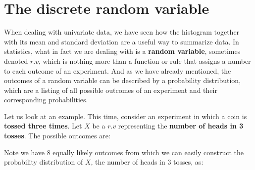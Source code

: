 \documentclass[
  letterpaper,
  DIV=11,
  numbers=noendperiod]{scrreprt}
\begin{document}
\section{The discrete random
variable}\label{the-discrete-random-variable}

When dealing with univariate data, we have seen how the histogram
together with its mean and standard deviation are a useful way to
summarize data. In statistics, what in fact we are dealing with is a
\textbf{random variable}, sometimes denoted \(r.v\), which is nothing
more than a function or rule that assigns a number to each outcome of an
experiment. And as we have already mentioned, the outcomes of a random
variable can be described by a probability distribution, which are a
listing of all possible outcomes of an experiment and their
corresponding probabilities.

Let us look at an example. This time, consider an experiment in which a
coin is \textbf{tossed three times}. Let \(X\) be a \(r.v\) representing
the \textbf{number of heads in 3 tosses}. The possible outcomes are:

\begin{table}

\caption{\label{tbl-tosses}Outcomes of 3 tosses of a coin}


\end{table}%

Note we have 8 equally likely outcomes from which we can easily
construct the probability distribution of \(X\), the number of heads in
3 tosses, as:
\end{document}
